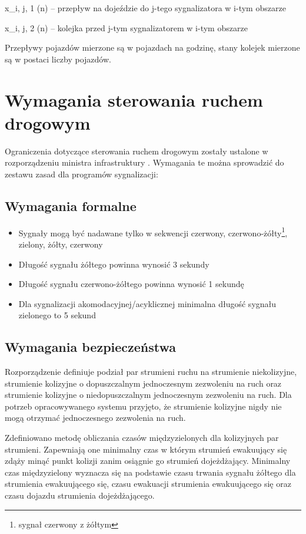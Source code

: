 x_{i, j, 1} (n) \textrm{ -- przepływ na dojeździe do j-tego sygnalizatora w i-tym obszarze}

x_{i, j, 2} (n) \textrm{ -- kolejka przed j-tym sygnalizatorem w i-tym obszarze}

\vspace{1.5cm}
Przepływy pojazdów mierzone są w pojazdach na godzinę, stany kolejek mierzone są w postaci liczby pojazdów.

\section{Wymagania sterowania ruchem drogowym}
\label{sec:model_ograniczenia}
Ograniczenia dotyczące sterowania ruchem drogowym zostały ustalone w rozporządzeniu ministra infrastruktury \cite{rozporzadzenie}. Wymagania te można sprowadzić do zestawu zasad dla programów sygnalizacji:
\subsection{Wymagania formalne}
\begin{itemize}
	\item Sygnały mogą być nadawane tylko w sekwencji czerwony, czerwono-żółty\footnote{sygnał czerwony z żółtym}, zielony, żółty, czerwony
	\item Długość sygnału żółtego powinna wynosić 3 sekundy
	\item Długość sygnału czerwono-żółtego powinna wynosić 1 sekundę
	\item Dla sygnalizacji akomodacyjnej/acyklicznej minimalna długość sygnału zielonego to 5 sekund
\end{itemize}

\subsection{Wymagania bezpieczeństwa}
Rozporządzenie definiuje podział par strumieni ruchu na strumienie niekolizyjne, strumienie kolizyjne o dopuszczalnym jednoczesnym zezwoleniu na ruch oraz strumienie kolizyjne o niedopuszczalnym jednoczesnym zezwoleniu na ruch.
Dla potrzeb opracowywanego systemu przyjęto, że strumienie kolizyjne nigdy nie mogą otrzymać jednoczesnego zezwolenia na ruch.

Zdefiniowano metodę obliczania czasów międzyzielonych dla kolizyjnych par strumieni. Zapewniają one minimalny czas w którym strumień ewakuujący się zdąży minąć punkt kolizji zanim osiągnie go strumień dojeżdżający. Minimalny czas międzyzielony wyznacza się na podstawie czasu trwania sygnału żółtego dla strumienia ewakuującego się, czasu ewakuacji strumienia ewakuującego się oraz czasu dojazdu strumienia dojeżdżającego.

